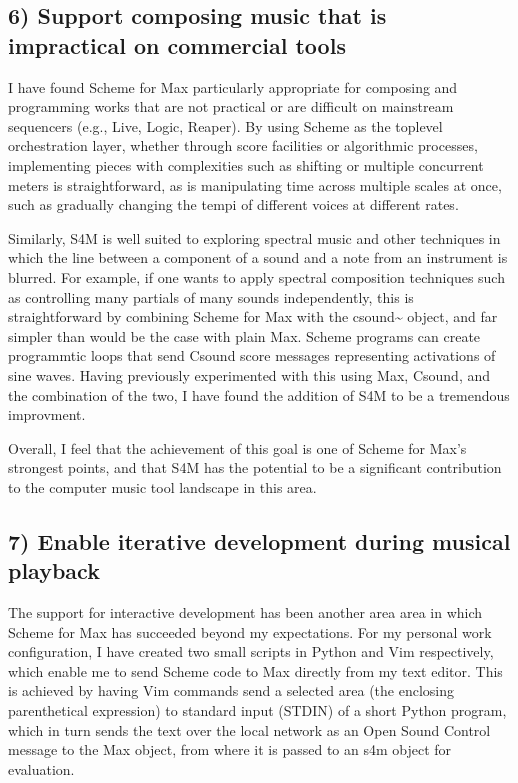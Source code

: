 \documentclass[letterpaper,10pt,english]{sphinxmanual}
\begin{document}
\subsection{6) Support composing music that is impractical on commercial tools}
\label{\detokenize{conclusion:support-composing-music-that-is-impractical-on-commercial-tools}}
\sphinxAtStartPar
I have found Scheme for Max particularly appropriate for composing and programming works that are
not practical or are difficult on mainstream sequencers (e.g., Live, Logic, Reaper).
By using Scheme as the top\sphinxhyphen{}level orchestration layer, whether through score facilities
or algorithmic processes, implementing pieces with complexities such as shifting or multiple concurrent
meters is straightforward, as is manipulating time across multiple scales at once, such as gradually
changing the tempi of different voices at different rates.

\sphinxAtStartPar
Similarly, S4M is well suited to exploring spectral music and other techniques in which the line between a
component of a sound and a note from an instrument is blurred. For example, if one wants to apply spectral composition
techniques such as controlling many partials of many sounds independently, this is straightforward by combining
Scheme for Max with the csound\textasciitilde{} object, and far simpler than would be the case with plain Max.
Scheme programs can create programmtic loops that send Csound score messages representing activations
of sine waves. Having previously experimented with this using Max, Csound, and the combination of the two, I have
found the addition of S4M to be a tremendous improvment.

\sphinxAtStartPar
Overall, I feel that the achievement of this goal is one of Scheme for Max’s strongest points,
and that S4M has the potential to be a significant contribution to the computer music tool landscape
in this area.


\subsection{7) Enable iterative development during musical playback}
\label{\detokenize{conclusion:enable-iterative-development-during-musical-playback}}
\sphinxAtStartPar
The support for interactive development has been another area area in which Scheme for Max has succeeded beyond
my expectations.
For my personal work configuration, I have created two small scripts in Python and Vim respectively,
which enable me to send Scheme code to Max directly from my text editor.
This is achieved by having Vim commands send a selected area (the enclosing parenthetical expression)
to standard input (STDIN) of a short Python program, which in turn sends the text over the local
network as an Open Sound Control message to the Max  object, from where it is passed
to an s4m object for evaluation.
\end{document}
